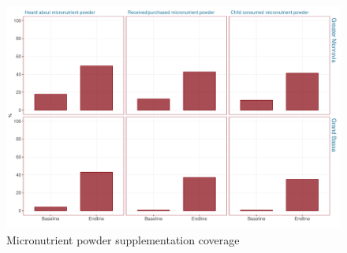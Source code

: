 \documentclass[12pt,a4paper]{article}
\begin{document}
\begin{figure}[H]

{\centering \includegraphics{liberiaCoverageFinalReport_files/figure-latex/mnp1plot-1} 

}

\caption{Micronutrient powder supplementation coverage}\label{fig:mnp1plot}
\end{figure}
\end{document}
